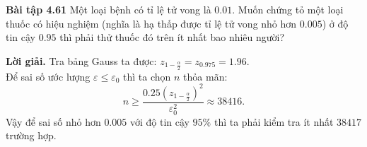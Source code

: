 \documentclass[12pt,a4paper]{article}
\begin{document}
\begin{mybox}
\textbf{Bài tập 4.61} Một loại bệnh có tỉ lệ tử vong là $0.01.$ Muốn chứng tỏ một loại thuốc có hiệu nghiệm (nghĩa là hạ thấp được tỉ lệ tử vong nhỏ hơn $0.005$) ở độ tin cậy $0.95$ thì phải thử thuốc đó trên ít nhất bao nhiêu người?
\end{mybox}
\textbf{Lời giải.} Tra bảng Gauss ta được: $z_{1 - \frac{\alpha}{2}} = z_{0.975} = 1.96.$\\
Để sai số ước lượng $\varepsilon \leqslant \varepsilon_0$ thì ta chọn $n$ thỏa mãn:
$$n \geqslant \frac{{0.25{{\left( {{z_{1 - \frac{\alpha }{2}}}} \right)}^2}}}{{\varepsilon _0^2}} \approx 38416.$$
Vậy để sai số nhỏ hơn $0.005$ với độ tin cậy $95\%$ thì ta phải kiểm tra ít nhất $38417$ trường hợp.
\end{document}
